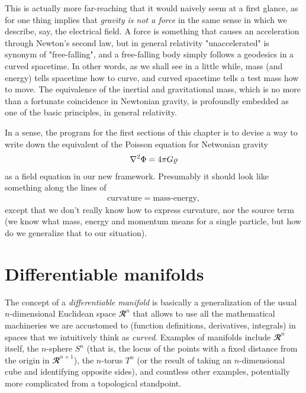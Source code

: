 This is actually more far-reaching that it would naively seem at a first glance,
as for one thing implies that \emph{gravity is not a force} in the same sense in
which we describe, say, the electrical field. A force is something that causes an
acceleration through Newton's second law, but in general relativity "unaccelerated"
is synonym of "free-falling", and a free-falling body simply follows a geodesics
in a curved spacetime. In other words, as we shall see in a little while, mass
(and energy) tells spacetime how to curve, and curved spacetime tells a test mass
how to move. The equivalence of the inertial and gravitational mass, which is no more
than a fortunate coincidence in Newtonian gravity, is profoundly embedded as one
of the basic principles, in general relativity.

In a sense, the program for the first sections of this chapter is to devise a way
to write down the equivalent of the Poisson equation for Netwonian gravity
\begin{align}
  \nabla^2 \Phi = 4\pi G \varrho
\end{align}
as a field equation in our new framework. Presumably it should look like something
along the lines of
\begin{align}
  \text{curvature} = \text{mass-energy},
\end{align}
except that we don't really know how to express curvature, nor the source term (we
know what mass, energy and momentum means for a single particle, but how do we
generalize that to our situation).



\section{Differentiable manifolds}

The concept of a \emph{differentiable manifold} is basically a generalization of the
usual $n$-dimensional Euclidean space $\mathbfcal{R}^n$ that allows to use all the
mathematical machineries we are accustomed to (function definitions, derivatives,
integrals) in spaces that we intuitively think as \emph{curved}. Examples of manifolds
include $\mathbfcal{R}^n$ itself, the $n$-sphere $S^n$ (that is, the locus of the
points with a fixed distance from the origin in $\mathbfcal{R}^{n + 1}$), the
$n$-torus $T^n$ (or the result of taking an $n$-dimensional cube and identifying
opposite sides), and countless other examples, potentially more complicated from a
topological standpoint.

